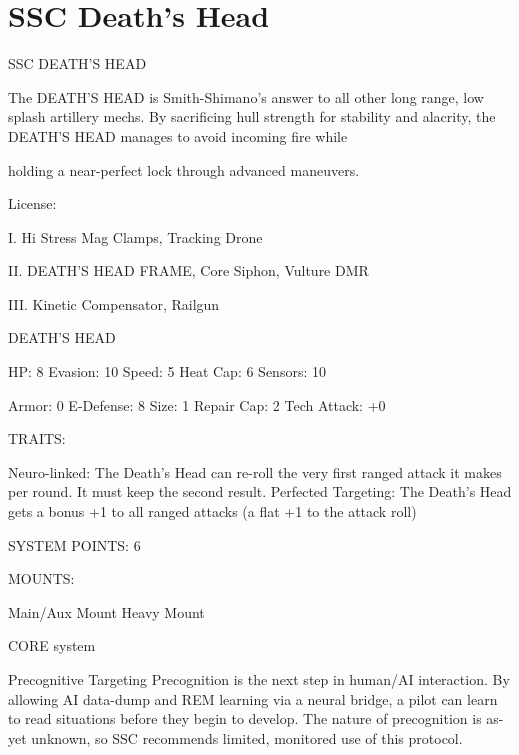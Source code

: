 \section{SSC Death's Head}

                                         SSC DEATH’S HEAD  

The DEATH’S HEAD is Smith-Shimano’s answer to all other long range, low splash artillery mechs. By  
sacrificing hull strength for stability and alacrity, the DEATH’S HEAD manages to avoid incoming fire while  

holding a near-perfect lock through advanced maneuvers.   

                                                    License:
 
I. Hi Stress Mag Clamps, Tracking Drone
 
II. DEATH’S HEAD FRAME, Core Siphon, Vulture DMR
 
III. Kinetic Compensator, Railgun
 

                                               DEATH’S HEAD 

  HP: 8           Evasion: 10                           Speed: 5            Heat Cap: 6        Sensors: 10 

  Armor: 0        E-Defense: 8                          Size: 1             Repair Cap: 2      Tech Attack:  
                                                                                               +0 

                                                     TRAITS: 

  Neuro-linked: The Death’s Head can re-roll the very first ranged attack it makes per round. It must keep 
  the second result. 
  Perfected Targeting: The Death’s Head gets a bonus +1 to all ranged attacks (a flat +1 to the attack 
  roll) 

                                              SYSTEM POINTS: 6 

                                                    MOUNTS: 

  Main/Aux Mount                     Heavy Mount 

                                                  CORE system 

                                                                                                               


                                                 Precognitive Targeting  
  Precognition is the next step in human/AI interaction. By allowing AI data-dump and REM learning via a  
  neural bridge, a pilot can learn to read situations before they begin to develop. The nature of  
  precognition is as-yet unknown, so SSC recommends limited, monitored use of this protocol.   


